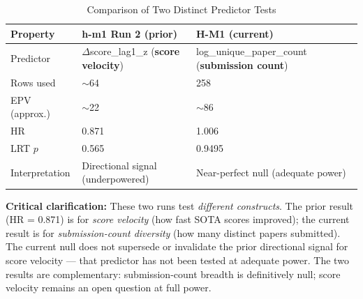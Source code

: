 \begin{table}[h]
\centering
\caption{Comparison of Two Distinct Predictor Tests}
\label{tab:comparison}
\begin{tabular}{@{}lll@{}}
\toprule
Property & h-m1 Run 2 (prior) & H-M1 (current) \\
\midrule
Predictor & $\Delta$score\_lag1\_z (\textbf{score velocity}) & log\_unique\_paper\_count (\textbf{submission count}) \\
Rows used & $\sim$64 & 258 \\
EPV (approx.) & $\sim$22 & $\sim$86 \\
HR & 0.871 & 1.006 \\
LRT $p$ & 0.565 & 0.9495 \\
Interpretation & Directional signal (underpowered) & Near-perfect null (adequate power) \\
\bottomrule
\end{tabular}
\end{table}

\textbf{Critical clarification:} These two runs test \emph{different constructs}. The prior result (HR = 0.871) is for \emph{score velocity} (how fast SOTA scores improved); the current result is for \emph{submission-count diversity} (how many distinct papers submitted). The current null does not supersede or invalidate the prior directional signal for score velocity --- that predictor has not been tested at adequate power. The two results are complementary: submission-count breadth is definitively null; score velocity remains an open question at full power.
